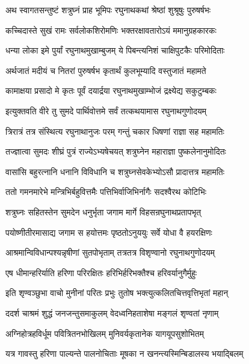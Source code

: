 

\twolineshloka
{अथ स्वागतसन्तुष्टं शत्रुघ्नं प्राह भूमिपः}
{रघुनाथकथां श्रेष्ठां शुश्रूषुः पुरुषर्षभः}%


\twolineshloka
{कच्चिदास्ते सुखं रामः सर्वलोकशिरोमणिः}
{भक्तरक्षावतारोऽयं ममानुग्रहकारकः}%

\twolineshloka
{धन्या लोका इमे पुर्यां रघुनाथमुखाम्बुजम्}
{ये पिबन्त्यनिशं चाक्षिपुटकैः परिमोदिताः}%

\twolineshloka
{अर्थजातं मदीयं च नितरां पुरुषर्षभ}
{कृतार्थं कुलभूम्यादि वस्तुजातं महामते}%

\twolineshloka
{कामाक्षया प्रसादो मे कृतः पूर्वं दयार्द्रया}
{रघुनाथमुखाम्भोजं द्रक्ष्येद्य सकुटुम्बकः}%

\twolineshloka
{इत्युक्तवति वीरे तु सुमदे पार्थिवोत्तमे}
{सर्वं तत्कथयामास रघुनाथगुणोदयम्}%

\twolineshloka
{त्रिरात्रं तत्र संस्थित्य रघुनाथानुजः परम्}
{गन्तुं चकार धिषणां राज्ञा सह महामतिः}%

\twolineshloka
{तज्ज्ञात्वा सुमदः शीघ्रं पुत्रं राज्येऽभ्यषेचयत्}
{शत्रुघ्नेन महाराज्ञा पुष्कलेनानुमोदितः}%

\twolineshloka
{वासांसि बहुरत्नानि धनानि विविधानि च}
{शत्रुघ्नसेवकेभ्योऽसौ प्रादात्तत्र महामतिः}%

\twolineshloka
{ततो गमनमारेभे मन्त्रिभिर्बहुवित्तमैः}
{पत्तिभिर्वाजिभिर्नागैः सदश्वैरथ कोटिभिः}%

\twolineshloka
{शत्रुघ्नः सहितस्तेन सुमदेन धनुर्भृता}
{जगाम मार्गे विहसन्रघुनाथप्रतापभृत्}%

\twolineshloka
{पयोष्णीतीरमासाद्य जगाम स हयोत्तमः}
{पृष्ठतोऽनुययुः सर्वे योधा वै हयरक्षिणः}%

\twolineshloka
{आश्रमान्विविधान्पश्यन्नृषीणां सुतपोभृताम्}
{तत्रतत्र विशृण्वानो रघुनाथगुणोदयम्}%

\twolineshloka
{एष धीमान्हरिर्याति हरिणा परिरक्षितः}
{हरिभिर्हरिभक्तैश्च हरिवर्यानुगैर्मुहुः}%

\twolineshloka
{इति शृण्वञ्छुभा वाचो मुनीनां परितः प्रभुः}
{तुतोष भक्त्युत्कलितचित्तवृत्तिभृतां महान्}%

\twolineshloka
{ददर्श चाश्रमं शुद्धं जनजन्तुसमाकुलम्}
{वेदध्वनिहताशेषा मङ्गलं शृण्वतां नृणाम्}%

\twolineshloka
{अग्निहोत्रहविर्धूम पवित्रितनभोखिलम्}
{मुनिवर्यकृतानेक यागयूपसुशोभितम्}%

\twolineshloka
{यत्र गावस्तु हरिणा पाल्यन्ते पालनोचिताः}
{मूषका न खनन्त्यस्मिन्बिडालस्य भयाद्बिलम्}%


